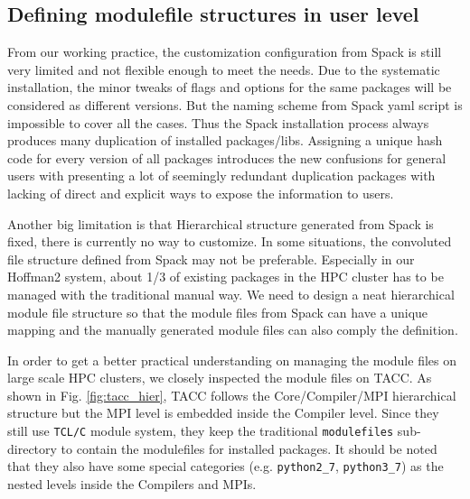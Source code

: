 \documentclass[conference]{IEEEtran}
\begin{document}
\subsection{Defining modulefile structures in user level} \label{subsec_redefine_h2_modulefiles}

From our working practice, the customization configuration from Spack is still very limited and not flexible enough to meet the needs.
Due to the systematic installation, the minor tweaks of flags and options for the same packages will be considered as different versions. But the naming scheme from Spack yaml script is impossible to cover all the cases. 
Thus the Spack installation process always produces many duplication of installed packages/libs. Assigning a unique hash code for every version of all packages introduces the new confusions for general users with presenting a lot of seemingly redundant duplication packages with lacking of direct and explicit ways to expose the information to users.

Another big limitation is that Hierarchical structure generated from Spack is fixed, there is currently no way to customize. In some situations, the convoluted file structure defined from Spack may not be preferable. 
Especially in our Hoffman2 system, about 1/3 of existing packages in the HPC cluster has to be managed with the traditional manual way. We need to design a neat hierarchical module file structure so that the module files from Spack can have a unique mapping and the manually generated module files can also comply the definition.

In order to get a better practical understanding on managing the module files on large scale HPC clusters, we closely inspected the module files on TACC. As shown in Fig. \ref{fig:tacc_hier}, TACC follows the Core/Compiler/MPI hierarchical structure but the MPI level is embedded inside the Compiler level. Since they still use \texttt{TCL/C} module system, they keep the traditional \texttt{modulefiles} sub-directory to contain the modulefiles for installed packages. It should be noted that they also have some special categories (e.g. \texttt{python2\_7}, \texttt{python3\_7}) as the nested levels inside the Compilers and MPIs.
\end{document}
